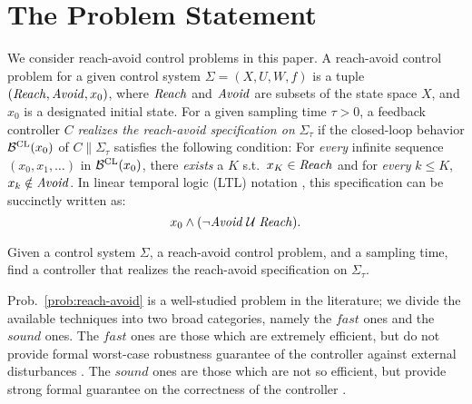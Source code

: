 
\section{The Problem Statement}

We consider reach-avoid control problems in this paper.
A reach-avoid control problem for a given control system $\Sigma=(X,U,W,f)$ is a tuple $(\mathit{Reach},\mathit{Avoid},x_0)$, where $\mathit{Reach}$ and $\mathit{Avoid}$ are subsets of the state space $X$, and $x_0$ is a designated initial state.
For a given sampling time $\tau>0$, a feedback controller $C$ \emph{realizes the reach-avoid specification on} $\Sigma_\tau$ if the closed-loop behavior $\mathcal{B}^{\mathrm{CL}}(x_0)$ of $C\parallel\Sigma_\tau$ satisfies the following condition: For \emph{every} infinite sequence $(x_0,x_1,\ldots)$ in $\mathcal{B}^{\mathrm{CL}}(x_0)$, there \emph{exists} a $K$ s.t.\ $x_K\in \mathit{Reach}$ and for \emph{every} $k\leq K$, $x_k\notin \mathit{Avoid}$. 
In linear temporal logic (LTL) notation \cite{baier2008principles}, this specification can be succinctly written as:
\begin{equation}\label{eq:spec}
	x_0 \wedge (\lnot \mathit{Avoid}\; \mathcal{U}\;\mathit{Reach}).
\end{equation}

\begin{problem}\label{prob:reach-avoid}
	Given a control system $\Sigma$, a reach-avoid control problem, and a sampling time, find a controller that realizes the reach-avoid specification on $\Sigma_\tau$.
\end{problem}

Prob.~\ref{prob:reach-avoid} is a well-studied problem in the literature; we divide the available techniques into two broad categories, namely the $\mathit{fast}$ ones and the $\mathit{sound}$ ones.
The $\mathit{fast}$ ones are those which are extremely efficient, but do not provide formal worst-case robustness guarantee of the controller against external disturbances \cite{howell2019altro,choset2005principles}.
The $\mathit{sound}$ ones are those which are not so efficient, but provide strong formal guarantee on the correctness of the controller \cite{reissig2016feedback,fisac2015reach,tedrake2009lqr}.

